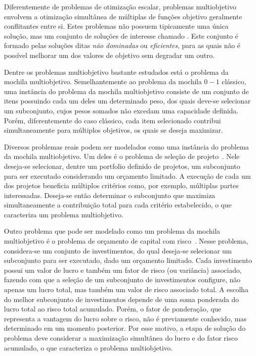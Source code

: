 Diferentemente de problemas de otimização escalar, problemas multiobjetivo
envolvem a otimização simultânea de múltiplas de funções objetivo geralmente 
conflitantes entre si.
Estes problemas não possuem tipicamente uma única solução, mas um conjunto
de soluções de interesse chamado \emph{\paretoset{}}.
Este conjunto é formado pelas soluções ditas \emph{não dominadas} ou \emph{eficientes},
para as quais não é possível melhorar um dos valores de objetivo sem degradar um outro.

Dentre os problemas multiobjetivo bastante estudados
está o problema da mochila multiobjetivo.
Semelhantemente ao problema da mochila $0-1$ clássico,
uma instância do problema da mochila multiobjetivo consiste de um conjunto
de itens possuindo cada um deles um determinado peso,
dos quais deve-se selecionar um subconjunto, cujos pesos somados não excedam uma
capacidade definida.
Porém, diferentemente do caso clássico, cada item selecionado contribui
simultaneamente para múltiplos objetivos, os quais se deseja maximizar.


Diversos problemas reais podem ser modelados como uma instância do problema da mochila multiobjetivo.
Um deles é o problema de seleção de projeto~\cite{teng1996multiobjective}.
Nele deseja-se selecionar, dentre um portfolio definido de projetos,
um subconjunto para ser executado considerando um orçamento limitado.
A execução de cada um dos projetos beneficia múltiplos critérios como,
por exemplo, múltiplas partes interessadas.
Deseja-se então determinar o subconjunto que maximiza simultaneamente a contribuição total
para cada critério estabelecido, o que caracteriza um problema multiobjetivo.

Outro problema que pode ser modelado como um problema da mochila multiobjetivo
é o problema de orçamento de capital com risco~\cite{rosenblatt1989generating}.
Nesse problema, considera-se um conjunto de investimentos,
do qual deseja-se selecionar um subconjunto para ser executado, dado um orçamento limitado.
Cada investimento possui um valor de lucro e também um fator de risco (ou variância) associado,
fazendo com que a seleção de um subconjunto de investimentos configure, não apenas um lucro total,
mas também um valor de risco associado total.
A escolha do melhor subconjunto de investimentos depende de uma soma ponderada do lucro total
ao risco total acumulado.
Porém, o fator de ponderação, que representa a vantagem do lucro sobre o risco,
não é previamente conhecido, mas determinado em um momento posterior.
Por esse motivo, a etapa de solução do problema deve considerar
a maximização simultânea do lucro e do fator risco acumulado,
o que caracteriza o problema multiobjetivo.

